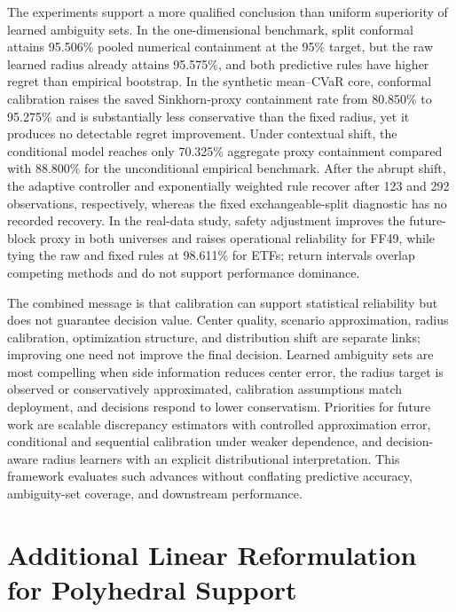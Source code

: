 \documentclass[11pt]{article}
\newcommand{\1}{\mathbf{1}}
\begin{document}
The experiments support a more qualified conclusion than uniform superiority of learned ambiguity sets.  In the one-dimensional benchmark, split conformal attains 95.506\% pooled numerical containment at the 95\% target, but the raw learned radius already attains 95.575\%, and both predictive rules have higher regret than empirical bootstrap.  In the synthetic mean--CVaR core, conformal calibration raises the saved Sinkhorn-proxy containment rate from 80.850\% to 95.275\% and is substantially less conservative than the fixed radius, yet it produces no detectable regret improvement.  Under contextual shift, the conditional model reaches only 70.325\% aggregate proxy containment compared with 88.800\% for the unconditional empirical benchmark.  After the abrupt shift, the adaptive controller and exponentially weighted rule recover after 123 and 292 observations, respectively, whereas the fixed exchangeable-split diagnostic has no recorded recovery.  In the real-data study, safety adjustment improves the future-block proxy in both universes and raises operational reliability for FF49, while tying the raw and fixed rules at 98.611\% for ETFs; return intervals overlap competing methods and do not support performance dominance.

The combined message is that calibration can support statistical reliability but does not guarantee decision value.  Center quality, scenario approximation, radius calibration, optimization structure, and distribution shift are separate links; improving one need not improve the final decision.  Learned ambiguity sets are most compelling when side information reduces center error, the radius target is observed or conservatively approximated, calibration assumptions match deployment, and decisions respond to lower conservatism.  Priorities for future work are scalable discrepancy estimators with controlled approximation error, conditional and sequential calibration under weaker dependence, and decision-aware radius learners with an explicit distributional interpretation.  This framework evaluates such advances without conflating predictive accuracy, ambiguity-set coverage, and downstream performance.

\appendix

\section{Additional Linear Reformulation for Polyhedral Support}
\end{document}
